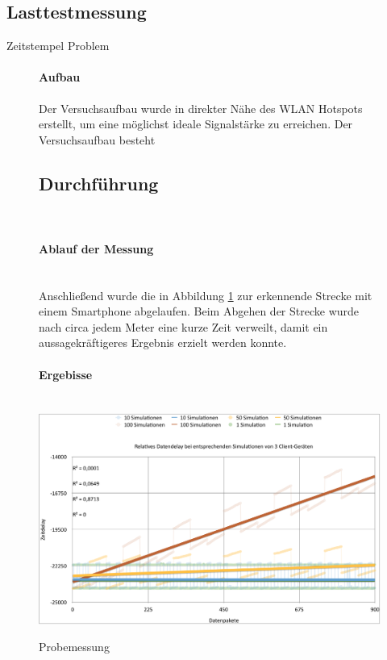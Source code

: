 \documentclass[a4paper]{spie}  %
\begin{document}
\subsection{Lasttestmessung}\label{Lasttestmessung}
Zeitstempel Problem
\begin{figure}[H]
\vspace{0pt}
\paragraph{Aufbau}
Der Versuchsaufbau wurde in direkter Nähe des WLAN Hotspots erstellt, um eine möglichst ideale Signalstärke zu erreichen. Der Versuchsaufbau besteht
\hfill
\vspace{0pt}

\subsection{Durchführung}\mbox{}\\
\paragraph{Ablauf der Messung}\mbox{}\\
Anschließend wurde die in Abbildung \ref{fig:probeMessung} zur erkennende Strecke mit einem Smartphone abgelaufen. Beim Abgehen der Strecke wurde nach circa jedem Meter eine kurze Zeit verweilt, damit ein aussagekräftigeres Ergebnis erzielt werden konnte.

\paragraph{Ergebisse}\mbox{}\\

\centering
		\includegraphics[width=15cm]{./images/LasttestDiagramm.png}
		\caption{Probemessung}
		\label{fig:probeMessung}
\end{figure}
\end{document}
